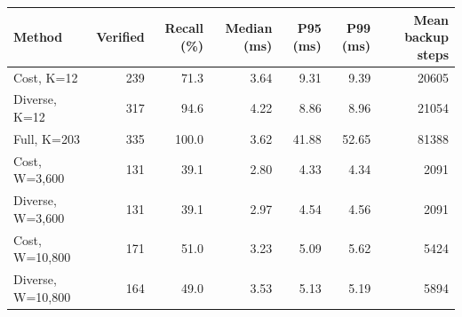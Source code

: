 \begin{tabular}{lrrrrrr}
\toprule
Method & Verified & Recall (\%) & Median (ms) & P95 (ms) & P99 (ms) & Mean backup steps \\
\midrule
Cost, K=12 & 239 & 71.3 & 3.64 & 9.31 & 9.39 & 20605 \\
Diverse, K=12 & 317 & 94.6 & 4.22 & 8.86 & 8.96 & 21054 \\
Full, K=203 & 335 & 100.0 & 3.62 & 41.88 & 52.65 & 81388 \\
Cost, W=3,600 & 131 & 39.1 & 2.80 & 4.33 & 4.34 & 2091 \\
Diverse, W=3,600 & 131 & 39.1 & 2.97 & 4.54 & 4.56 & 2091 \\
Cost, W=10,800 & 171 & 51.0 & 3.23 & 5.09 & 5.62 & 5424 \\
Diverse, W=10,800 & 164 & 49.0 & 3.53 & 5.13 & 5.19 & 5894 \\
\bottomrule
\end{tabular}
